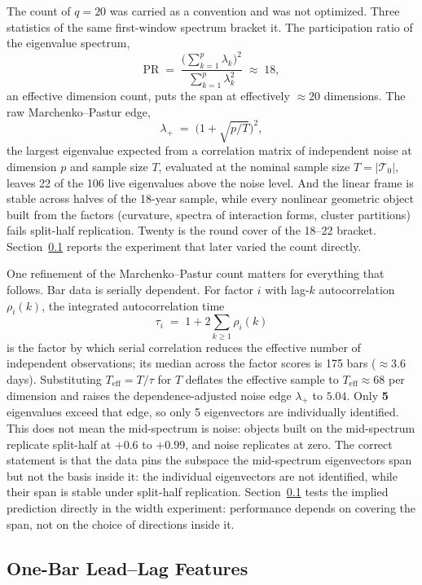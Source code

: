 The count of $q = 20$ was carried as a convention and was not optimized.
Three statistics of the same first-window spectrum bracket it. The
participation ratio of the eigenvalue spectrum,
\[
\mathrm{PR} \;=\;
\frac{\bigl( \sum_{k=1}^{p} \lambda_k \bigr)^2}{\sum_{k=1}^{p} \lambda_k^2}
\;\approx\; 18,
\]
an effective dimension count, puts the span at effectively $\approx 20$
dimensions. The raw Marchenko--Pastur edge,
\[
\lambda_+ \;=\; \bigl( 1 + \sqrt{p/T} \bigr)^2,
\]
the largest eigenvalue expected from a correlation matrix of independent
noise at dimension $p$ and sample size $T$, evaluated at the nominal sample
size $T = |\mathcal{T}_0|$, leaves 22 of the 106 live eigenvalues above the
noise level. And the linear frame is stable across halves of the 18-year
sample, while every nonlinear geometric object built from the factors
(curvature, spectra of interaction forms, cluster partitions) fails
split-half replication. Twenty is the round cover of the 18--22 bracket.
Section~\ref{sec:trans-leadlag} reports the experiment that later varied the
count directly.

One refinement of the Marchenko--Pastur count matters for everything that
follows. Bar data is serially dependent. For factor $i$ with lag-$k$
autocorrelation $\rho_i(k)$, the integrated autocorrelation time
\[
\tau_i \;=\; 1 + 2 \sum_{k \ge 1} \rho_i(k)
\]
is the factor by which serial correlation reduces the effective number of
independent observations; its median across the factor scores is 175 bars
($\approx 3.6$ days). Substituting $T_{\mathrm{eff}} = T / \tau$ for $T$
deflates the effective sample to $T_{\mathrm{eff}} \approx 68$ per dimension
and raises the dependence-adjusted noise edge $\lambda_+$ to $5.04$. Only
\textbf{5} eigenvalues exceed that edge, so only 5 eigenvectors are
individually identified. This does not mean the mid-spectrum is noise:
objects built on the mid-spectrum replicate split-half at $+0.6$ to $+0.99$,
and noise replicates at zero. The correct statement is that the data pins the
subspace the mid-spectrum eigenvectors span but not the basis inside it: the
individual eigenvectors are not identified, while their span is stable under
split-half replication. Section~\ref{sec:trans-leadlag} tests the implied
prediction directly in the width experiment: performance depends on covering
the span, not on the choice of directions inside it.

\subsection{One-Bar Lead--Lag Features}
\label{sec:trans-leadlag}

